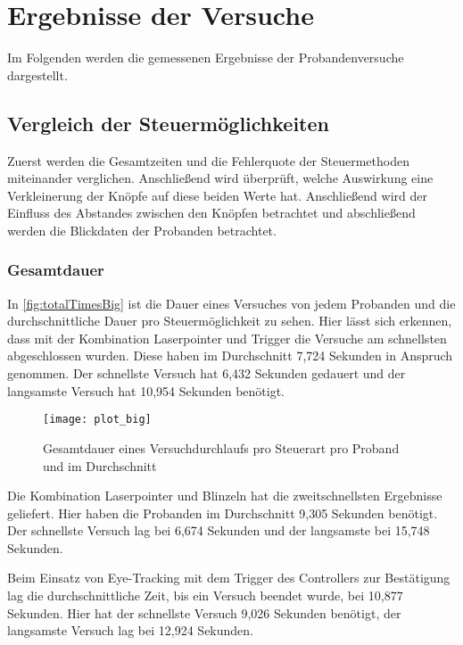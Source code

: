 \section{Ergebnisse der Versuche}
Im Folgenden werden die gemessenen Ergebnisse der Probandenversuche dargestellt. 
\subsection{Vergleich der Steuermöglichkeiten}
Zuerst werden die Gesamtzeiten und die Fehlerquote der Steuermethoden miteinander verglichen. Anschließend wird überprüft, welche Auswirkung eine Verkleinerung der Knöpfe auf diese beiden Werte hat. Anschließend wird der Einfluss des Abstandes zwischen den Knöpfen betrachtet und abschließend werden die Blickdaten der Probanden betrachtet.
\subsubsection{Gesamtdauer}
In \autoref{fig:totalTimesBig} ist die Dauer eines Versuches von jedem Probanden und die durchschnittliche Dauer pro Steuermöglichkeit zu sehen. Hier lässt sich erkennen, dass mit der Kombination Laserpointer und Trigger die Versuche am schnellsten abgeschlossen wurden. Diese haben im Durchschnitt 7,724 Sekunden in Anspruch genommen. Der schnellste Versuch hat 6,432 Sekunden gedauert und der langsamste Versuch hat 10,954 Sekunden benötigt.

\begin{figure}[!htbp]
	\centering
	\texttt{[image: plot\_big]}
	\caption[Gesamtdauer eines Versuchdurchlaufs pro Steuerart pro Proband und im Durchschnitt]{Gesamtdauer eines Versuchdurchlaufs pro Steuerart pro Proband und im Durchschnitt}
	\label{fig:totalTimesBig}
\end{figure}

Die Kombination Laserpointer und Blinzeln hat die zweitschnellsten Ergebnisse geliefert. Hier haben die Probanden im Durchschnitt 9,305 Sekunden benötigt. Der schnellste Versuch lag bei 6,674 Sekunden und der langsamste bei 15,748 Sekunden. 

Beim Einsatz von Eye-Tracking mit dem Trigger des Controllers zur Bestätigung lag die durchschnittliche Zeit, bis ein Versuch beendet wurde, bei 10,877 Sekunden. Hier hat der schnellste Versuch 9,026 Sekunden benötigt, der langsamste Versuch lag bei 12,924 Sekunden.


